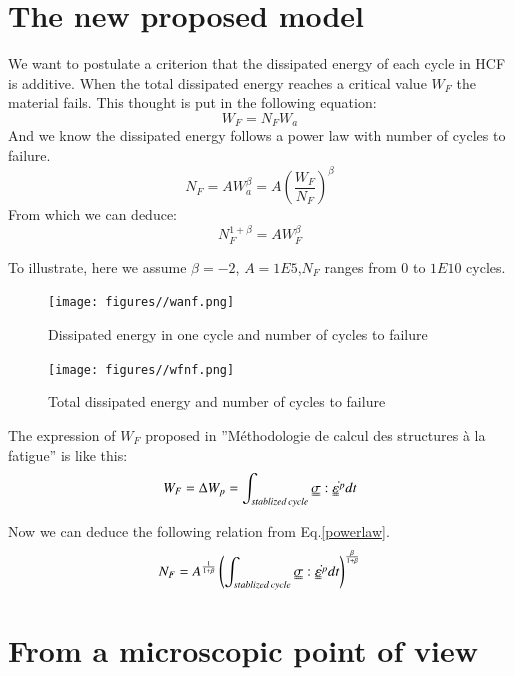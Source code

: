 \documentclass[3p,times,procedia,number]{elsarticle}
\begin{document}
\section{The new proposed model}
We want to postulate a criterion that the dissipated energy of each cycle in HCF is additive. When the total dissipated energy reaches a critical value $W_F$ the material fails. This thought is put in the following equation:
\begin{equation}
W_F=N_FW_a
\end{equation}
And we know the dissipated energy follows a power law with number of cycles to failure.
\begin{equation}
N_F=AW_a^\beta=A(\frac{W_F}{N_F})^\beta
\end{equation}
From which we can deduce:
\begin{equation}
N_F^{1+\beta}=AW_F^\beta
\label{powerlaw}
\end{equation}

To illustrate, here we assume $\beta=-2$, $A=1E5$,$N_F$ ranges from $0$ to $1E10$ cycles.

\begin{figure}[h!]
		\begin{minipage}[t]{0.5\textwidth}
	\texttt{[image: figures//wanf.png]} 
	\caption{Dissipated energy in one cycle and number of cycles to failure}
	\label{WA-NF}
		\end{minipage}
		\begin{minipage}[t]{0.5\textwidth}
	\texttt{[image: figures//wfnf.png]} 
	\caption{Total dissipated energy and number of cycles to failure}
	\label{WF-NF}
		\end{minipage}
\end{figure}


The expression of $W_F$ proposed in ''Méthodologie de calcul des structures à la fatigue'' is like this:
\begin{equation}
	W_F=\Delta W_p=\int_{stablized \, cycle}^{}\uuline{\sigma}:\dot{\uuline{\varepsilon}^p}dt
\end{equation}

Now we can deduce the following relation from Eq.\eqref{powerlaw}.
\begin{equation}
N_F=A^{\frac{1}{1+\beta}}\left(\int_{stablized \, cycle}^{}\uuline{\sigma}:\dot{\uuline{\varepsilon}^p}dt\right)^{\frac{\beta}{1+\beta}}
\end{equation}

\section{From a microscopic point of view}
\end{document}
